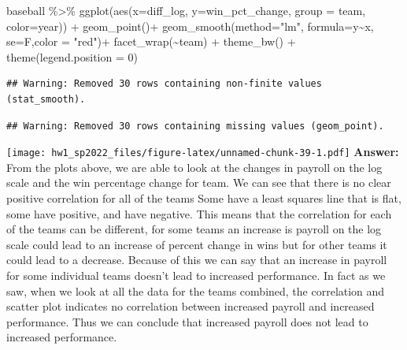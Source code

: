 \documentclass[
]{article}
\newenvironment{Shaded}{\begin{snugshade}}{\end{snugshade}}
\newcommand{\AttributeTok}[1]{\textcolor[rgb]{0.77,0.63,0.00}{#1}}
\newcommand{\DecValTok}[1]{\textcolor[rgb]{0.00,0.00,0.81}{#1}}
\newcommand{\FunctionTok}[1]{\textcolor[rgb]{0.00,0.00,0.00}{#1}}
\newcommand{\NormalTok}[1]{#1}
\newcommand{\SpecialCharTok}[1]{\textcolor[rgb]{0.00,0.00,0.00}{#1}}
\newcommand{\StringTok}[1]{\textcolor[rgb]{0.31,0.60,0.02}{#1}}
\begin{document}
\begin{Shaded}
\begin{Highlighting}[]
\NormalTok{baseball }\SpecialCharTok{\%\textgreater{}\%}
  \FunctionTok{ggplot}\NormalTok{(}\FunctionTok{aes}\NormalTok{(}\AttributeTok{x=}\NormalTok{diff\_log, }\AttributeTok{y=}\NormalTok{win\_pct\_change, }\AttributeTok{group =}\NormalTok{ team, }\AttributeTok{color=}\NormalTok{year)) }\SpecialCharTok{+}
  \FunctionTok{geom\_point}\NormalTok{()}\SpecialCharTok{+}
  \FunctionTok{geom\_smooth}\NormalTok{(}\AttributeTok{method=}\StringTok{"lm"}\NormalTok{, }\AttributeTok{formula=}\NormalTok{y}\SpecialCharTok{\textasciitilde{}}\NormalTok{x, }\AttributeTok{se=}\NormalTok{F,}\AttributeTok{color =} \StringTok{"red"}\NormalTok{)}\SpecialCharTok{+}
  \FunctionTok{facet\_wrap}\NormalTok{(}\SpecialCharTok{\textasciitilde{}}\NormalTok{team) }\SpecialCharTok{+} 
  \FunctionTok{theme\_bw}\NormalTok{() }\SpecialCharTok{+}
  \FunctionTok{theme}\NormalTok{(}\AttributeTok{legend.position =} \DecValTok{0}\NormalTok{)}
\end{Highlighting}
\end{Shaded}

\begin{verbatim}
## Warning: Removed 30 rows containing non-finite values (stat_smooth).
\end{verbatim}

\begin{verbatim}
## Warning: Removed 30 rows containing missing values (geom_point).
\end{verbatim}

\texttt{[image: hw1\_sp2022\_files/figure-latex/unnamed-chunk-39-1.pdf]}
\textbf{Answer:} From the plots above, we are able to look at the
changes in payroll on the log scale and the win percentage change for
team. We can see that there is no clear positive correlation for all of
the teams Some have a least squares line that is flat, some have
positive, and have negative. This means that the correlation for each of
the teams can be different, for some teams an increase is payroll on the
log scale could lead to an increase of percent change in wins but for
other teams it could lead to a decrease. Because of this we can say that
an increase in payroll for some individual teams doesn't lead to
increased performance. In fact as we saw, when we look at all the data
for the teams combined, the correlation and scatter plot indicates no
correlation between increased payroll and increased performance. Thus we
can conclude that increased payroll does not lead to increased
performance.
\end{document}
